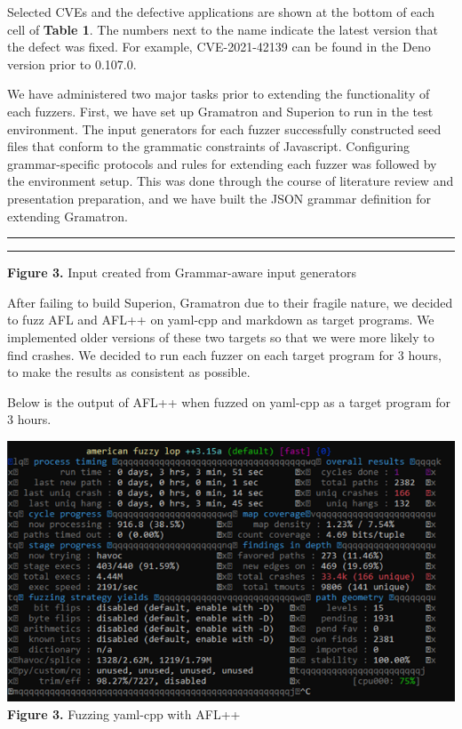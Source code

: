 \documentclass[12pt]{diazessay}
\begin{document}
Selected CVEs and the defective applications are shown at the bottom of each cell of \textbf{Table 1}. The numbers next to the name indicate the latest version that the defect was fixed. For example, CVE-2021-42139 can be found in the Deno version prior to 0.107.0.


We have administered two major tasks prior to extending the functionality of each fuzzers.
First, we have set up Gramatron and Superion to run in the test environment.
The input generators for each fuzzer successfully constructed seed files \cite{superion-example}\cite{gramatron-example}that conform to the grammatic constraints of Javascript.
Configuring grammar-specific protocols and rules for extending each fuzzer was followed by the environment setup.
This was done through the course of literature review and presentation preparation, and we have built the JSON grammar definition\cite{json-source.json} for extending Gramatron.

\vspace{12mm}
\hrule height 0.4mm
\begingroup \fontsize{12pt}{12pt} \selectfont \begin{alltt}

\end{alltt} \vspace{-6mm} \endgroup \hrule height 0.4mm
\vspace{6mm}
\centerline{\textbf{Figure 3.} Input created from Grammar-aware input generators}
\vspace{6mm}

After failing to build Superion, Gramatron due to their fragile nature, we decided to fuzz AFL and AFL++ on yaml-cpp and markdown as target programs. We implemented older versions of these two targets so that we were more likely to find crashes. We decided to run each fuzzer on each target program for 3 hours, to make the results as consistent as possible. 

Below is the output of AFL++ when fuzzed on yaml-cpp as a target program for 3 hours.

\begin{center}
    \includegraphics[scale=0.4, trim={0 3cm 0 0}, clip]{yamlfuzzer.png}
    \textbf{Figure 3.} Fuzzing yaml-cpp with AFL++
\end{center}
\end{document}
